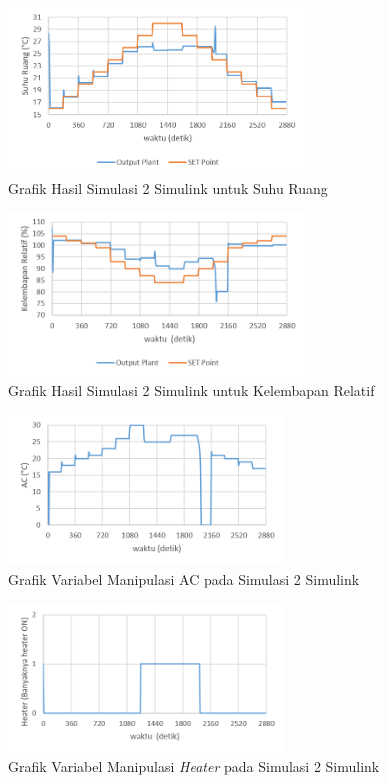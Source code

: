 \begin{figure}[!h]
	\centering
	\includegraphics[width=0.7\textwidth]{figures/Simulink2Td}
	\caption{Grafik Hasil Simulasi 2 Simulink untuk Suhu Ruang}
	\label{fig:5:Simulink2Td}
\end{figure}

\begin{figure}[!h]
	\centering
	\includegraphics[width=0.7\textwidth]{figures/Simulink2RH}
	\caption{Grafik Hasil Simulasi 2 Simulink untuk Kelembapan Relatif}
	\label{fig:5:Simulink2RH}
\end{figure}

\begin{figure}[!h]
	\centering
	\includegraphics[width=0.65\textwidth]{figures/Simulink2AC}
	\caption{Grafik Variabel Manipulasi AC pada Simulasi 2 Simulink}
	\label{fig:5:Simulink2AC}
\end{figure}

\begin{figure}[!h]
	\centering
	\includegraphics[width=0.65\textwidth]{figures/Simulink2HT}
	\caption{Grafik Variabel Manipulasi \textit{Heater} pada Simulasi 2 Simulink}
	\label{fig:5:Simulink2HT}
\end{figure}
\break

